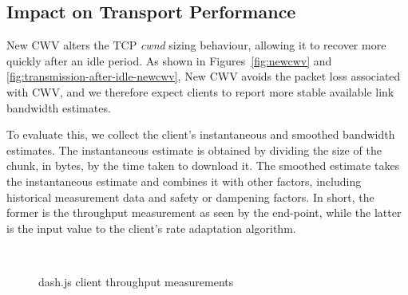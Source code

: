\documentclass[10pt,sigconf]{acmart}
\begin{document}
\subsection{Impact on Transport Performance} 
\label{sec:transport-impact}

New CWV alters the TCP \emph{cwnd} sizing behaviour, allowing it to recover more quickly after an idle period. As shown in Figures~\ref{fig:newcwv} and \ref{fig:transmission-after-idle-newcwv}, New CWV avoids the packet loss associated with CWV, and we therefore expect clients to report more stable available link bandwidth estimates. 

To evaluate this, we collect the client's instantaneous and smoothed bandwidth estimates. The instantaneous estimate is obtained by dividing the size of the chunk, in bytes, by the time taken to download it. The smoothed estimate takes the instantaneous estimate and combines it with other factors, including historical measurement data and safety or dampening factors. In short, the former is the throughput measurement as seen by the end-point, while the latter is the input value to the client's rate adaptation algorithm.

\begin{figure}[t!]
  \centering
  \\
  \caption{dash.js client throughput measurements}
  \label{fig:throughput-clients}
\end{figure}
\end{document}
